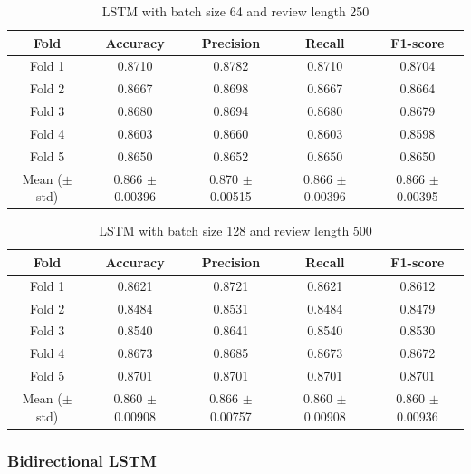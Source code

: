 \documentclass{article}
\begin{document}
\begin{table}[H]
  \centering
  \begin{tabular}{c|cccc}
      \toprule
      \textbf{Fold} & \textbf{Accuracy} & \textbf{Precision} & \textbf{Recall} & \textbf{F1-score} \\
      \midrule
      Fold 1 & 0.8710	& 0.8782 & 0.8710 & 0.8704 \\
      Fold 2 & 0.8667	& 0.8698 & 0.8667 & 0.8664 \\
      Fold 3 & 0.8680	& 0.8694 & 0.8680 & 0.8679 \\
      Fold 4 & 0.8603	& 0.8660 & 0.8603 & 0.8598 \\
      Fold 5 & 0.8650	& 0.8652 & 0.8650 & 0.8650 \\
      \midrule
      Mean ($\pm$ std) & 0.866 $\pm$ 0.00396 & 0.870 $\pm$ 0.00515 &	0.866 $\pm$ 0.00396 & 0.866 $\pm$ 0.00395 \\
      \bottomrule
  \end{tabular}
  \vspace{0.5em}
  \caption{LSTM with batch size 64 and review length 250}
\end{table}

\begin{table}[H]
  \centering
  \begin{tabular}{c|cccc}
      \toprule
      \textbf{Fold} & \textbf{Accuracy} & \textbf{Precision} & \textbf{Recall} & \textbf{F1-score} \\
      \midrule
      Fold 1 & 0.8621 & 0.8721 & 0.8621 & 0.8612 \\
      Fold 2 & 0.8484 & 0.8531 & 0.8484 & 0.8479 \\
      Fold 3 & 0.8540 & 0.8641 & 0.8540 & 0.8530 \\
      Fold 4 & 0.8673 & 0.8685 & 0.8673 & 0.8672 \\
      Fold 5 & 0.8701 & 0.8701 & 0.8701 & 0.8701 \\
      \midrule
      Mean ($\pm$ std) & 0.860 $\pm$ 0.00908 & 0.866 $\pm$ 0.00757 & 0.860 $\pm$ 0.00908 & 0.860 $\pm$ 0.00936 \\
      \bottomrule
  \end{tabular}
  \vspace{0.5em}
  \caption{LSTM with batch size 128 and review length 500}
\end{table}

\subsubsection{Bidirectional LSTM}
\end{document}
